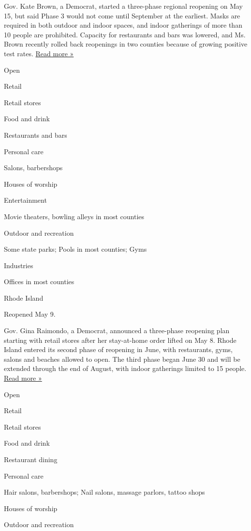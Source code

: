 Gov. Kate Brown, a Democrat, started a three-phase regional reopening on
May 15, but said Phase 3 would not come until September at the earliest.
Masks are required in both outdoor and indoor spaces, and indoor
gatherings of more than 10 people are prohibited. Capacity for
restaurants and bars was lowered, and Ms. Brown recently rolled back
reopenings in two counties because of growing positive test rates.
\href{https://www.oregonlive.com/news/2020/07/oregon-gov-kate-brown-announces-new-mask-mandate-for-kids-earlier-bar-and-restaurant-closure-times.html}{Read
more »}

Open

Retail

Retail stores

Food and drink

Restaurants and bars

Personal care

Salons, barbershops

Houses of worship

Entertainment

Movie theaters, bowling alleys in most counties

Outdoor and recreation

Some state parks; Pools in most counties; Gyms

Industries

Offices in most counties

Rhode Island

Reopened May 9.

Gov. Gina Raimondo, a Democrat, announced a three-phase reopening plan
starting with retail stores after her stay-at-home order lifted on May
8. Rhode Island entered its second phase of reopening in June, with
restaurants, gyms, salons and beaches allowed to open. The third phase
began June 30 and will be extended through the end of August, with
indoor gatherings limited to 15 people.
\href{https://www.wpri.com/health/coronavirus/july-29-ri-coronavirus-update/}{Read
more »}

Open

Retail

Retail stores

Food and drink

Restaurant dining

Personal care

Hair salons, barbershops; Nail salons, massage parlors, tattoo shops

Houses of worship

Outdoor and recreation

